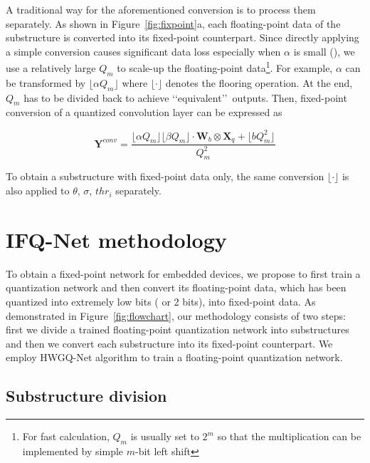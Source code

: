 \documentclass[10pt,twocolumn,letterpaper]{article}
\begin{document}
A traditional way for the aforementioned conversion is to process them separately. As shown in Figure~\ref{fig:fixpoint}a, each floating-point data of the substructure is converted into its fixed-point counterpart. Since directly applying a simple conversion causes significant data loss especially when $\alpha$ is small (), we use a relatively large $Q_m$ to scale-up the floating-point data\footnote{For fast calculation, $Q_m$ is usually set to $2^m$ so that the multiplication can be implemented by simple $m$-bit left shift}. For example, $\alpha$ can be transformed by $\lfloor\alpha Q_m\rfloor$ where $\lfloor\cdot\rfloor$ denotes the flooring operation. At the end, $Q_m$ has to be divided back to achieve \lq\lq equivalent\rq\rq\, outputs. Then, fixed-point conversion of a quantized convolution layer can be expressed as 



\begin{equation}
\textbf{Y}^{conv}=\frac{\lfloor\alpha Q_{m}\rfloor \lfloor\beta Q_{m}\rfloor\cdot\textbf{W}_b\otimes \textbf{X}_q+\lfloor b Q^2_{m}\rfloor}{Q^2_{m}}
\end{equation}

To obtain a substructure with fixed-point data only, the same conversion $\lfloor\cdot\rfloor$  is also applied to $\theta$, $\sigma$, $thr_i$ separately.

\section{IFQ-Net methodology}

To obtain a fixed-point network for embedded devices, we propose to first train a quantization network and then convert its floating-point data, which has been quantized into extremely low bits ( or 2 bits), into fixed-point data. As demonstrated in Figure~\ref{fig:flowchart}, our methodology consists of two steps: first we divide a trained floating-point quantization network into substructures and then we convert each substructure into its fixed-point counterpart. We employ HWGQ-Net algorithm to train a floating-point quantization network.



\subsection{Substructure division}
\end{document}
